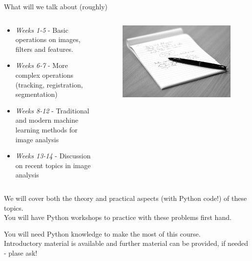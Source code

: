 \documentclass[9pt, aspectratio=169]{beamer}
\begin{document}
\begin{frame}
    {What will we talk about (roughly)}
    \begin{columns}
        \begin{column}{0.7\textwidth}
            \begin{itemize}
                \item \textit{Weeks 1-5} - Basic operations on images, filters and features.
                \item \textit{Weeks 6-7} - More complex operations (tracking, registration, segmentation)
                \item \textit{Weeks 8-12} - Traditional and modern machine learning methods for image analysis
                \item \textit{Weeks 13-14} - Discussion on recent topics in image analysis
            \end{itemize}
        \end{column}
        \begin{column}{0.3\textwidth}
            \begin{figure}
                \includegraphics[width=\textwidth]{notes.jpg}
                \caption{\color{gray}{Matt Cornock - CC BY-NC 2.0}}
            \end{figure}
        \end{column}
    \end{columns}
    \pause

    We will cover both the theory and practical aspects (with Python code!) of these topics.\\
    You will have Python workshops to practice with these problems first hand.

    \pause

    You will need Python knowledge to make the most of this course.\\
    Introductory material is available and further material can be provided, if needed - plase ask!
\end{frame}
\end{document}
